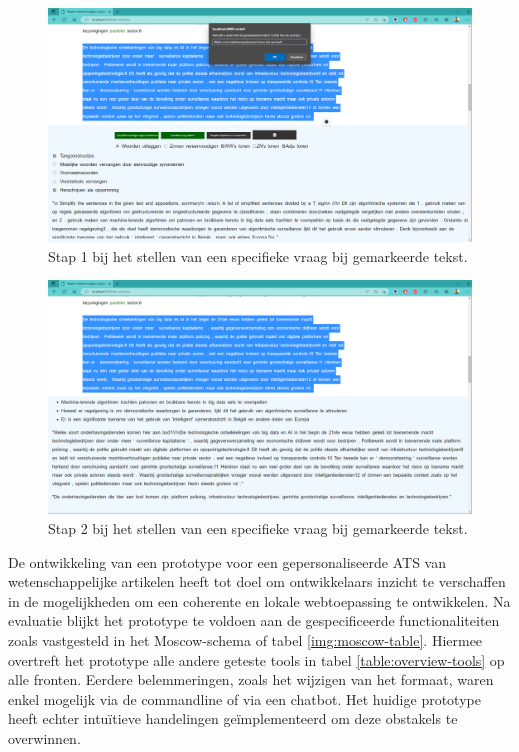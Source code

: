 \begin{center}
	\begin{figure}
		\includegraphics[width=\linewidth]{img/proto-vraagstelling-1.png}
		\caption{Stap 1 bij het stellen van een specifieke vraag bij gemarkeerde tekst.}
		\label{img:step-1-proto-vraagstelling}
	\end{figure}
\end{center}

\begin{center}
	\begin{figure}
		\includegraphics[width=\linewidth]{img/proto-vraagstelling-2.png}
		\caption{Stap 2 bij het stellen van een specifieke vraag bij gemarkeerde tekst.}
		\label{img:step-2-proto-vraagstelling}
	\end{figure}
\end{center}

De ontwikkeling van een prototype voor een gepersonaliseerde ATS van wetenschappelijke artikelen heeft tot doel om ontwikkelaars inzicht te verschaffen in de mogelijkheden om een coherente en lokale webtoepassing te ontwikkelen. Na evaluatie blijkt het prototype te voldoen aan de gespecificeerde functionaliteiten zoals vastgesteld in het Moscow-schema of tabel \ref{img:moscow-table}. Hiermee overtreft het prototype alle andere geteste tools in tabel \ref{table:overview-tools} op alle fronten. Eerdere belemmeringen, zoals het wijzigen van het formaat, waren enkel mogelijk via de commandline of via een chatbot. Het huidige prototype heeft echter intuïtieve handelingen geïmplementeerd om deze obstakels te overwinnen. 

